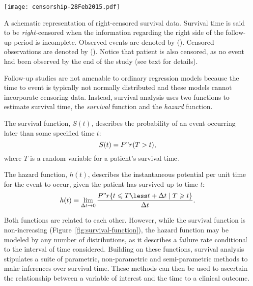 \begin{marginfigure}%
  \texttt{[image: censorship-28Feb2015.pdf]}
  \caption[Right-censored survival data]{A schematic representation of
    right-censored survival data.  Survival time is said to be
    \emph{right-}censored when the information regarding the right side of the
    follow-up period is incomplete.  Observed events are denoted by (\CIRCLE).
    Censored observations are denoted by (\Circle).  Notice that patient
     is also censored, as no event had been observed by the end
    of the study (see text for details).}\label{fig:censorship}%
\end{marginfigure}

Follow-up studies are not amenable to ordinary regression models because the
time to event is typically not normally distributed and these models cannot
incorporate censoring data.  Instead, survival analysis uses two functions to
estimate survival time, the \emph{survival} function and the \emph{hazard}
function.

The survival function, $S(t)$, describes the probability of an event occurring
later than some specified time $t$:
\begin{equation}
  \label{eq:survival-function}
  S(t) = P"r(T > t),
\end{equation}
where $T$ is a random variable for a patient's survival time.

The hazard function, $h(t)$, describes the instantaneous potential per unit time
for the event to occur, given the patient has survived up to time $t$:
\begin{equation}
  \label{eq:hazard-function}
  h(t) = \lim_{\Delta t \to 0}\frac{P"r\{t \leqslant T \less t + \Delta t
    \mid T \geqslant t \}}{\Delta t}.
\end{equation}


Both functions are related to each other.  However, while the survival function
is non-increasing (Figure~\ref{fig:survival-function}), the hazard function may
be modeled by any number of distributions, as it describes a failure rate
conditional to the interval of time considered.  Building on these functions,
survival analysis stipulates a suite of parametric, non-parametric and
semi-parametric methods to make inferences over survival time.  These methods
can then be used to ascertain the relationship between a variable of interest
and the time to a clinical outcome.

